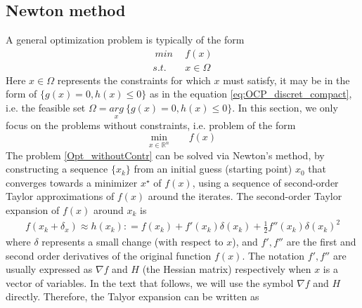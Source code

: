 \documentclass  [
  paper    = a4,
  BCOR     = 10mm,
  twoside,
  fontsize = 12pt,
  fleqn,
  toc      = bibnumbered,
  toc      = listofnumbered,
  numbers  = noendperiod,
  headings = normal,
  listof   = leveldown,
  version  = 3.03
]                                       {scrreprt}
\newcommand{\<}{\langle}
\renewcommand{\>}{\rangle}
\begin{document}



\subsection{Newton method}
A general optimization problem is typically of the form 
\begin{equation}
	\begin{aligned}
		\    min &\ \   f(x) \\
		s.t.  & \ \ x \in \Omega
	\end{aligned}
	\label{OptGen}
\end{equation}
Here $x \in \Omega$ represents the constraints for which $x$ must satisfy, it may be in the form of $\{g(x) = 0,  h(x)  \leq  0 \}$ as in the equation \ref{eq:OCP_discret_compact}, i.e. the feasible set $\Omega = \underset{x}{arg} \ \{ g(x) = 0,  h(x)  \leq  0 \}$. 
In this section, we only focus on the problems without constraints, i.e. problem of the form
\begin{equation}
	\underset{x \in \mathbb{R}^n}{\text{min}} \qquad f(x)	
	\label{Opt_withoutContr}
\end{equation}
The problem \ref{Opt_withoutContr} can be solved via Newton's method, by constructing a sequence $\{x_k\}$ from an initial guess (starting point) $x_0$ that converges towards a minimizer $x^\star$ of $f(x)$, using a sequence of second-order Taylor approximations of $f(x)$ around the iterates. The second-order Taylor expansion of $f(x)$ around $x_k$ is
\begin{align*}
	f(x_k + \delta_x) \approx h(x_k) : = f(x_k) + f'(x_k)\delta(x_k) +\frac{1}{2}f''(x_k)\delta(x_k)^2 
\end{align*}
where $\delta$ represents a small change (with respect to $x$), and $f', f''$ are the first and second order derivatives of the original function $f(x)$. The notation $f', f''$ are usually expressed as $\nabla f$ and  $H$ (the Hessian matrix) respectively when $x$ is a vector of variables. In the text that follows, we will use the symbol $\nabla f$ and $H$ directly. Therefore, the Talyor expansion can be written as 
\end{document}
